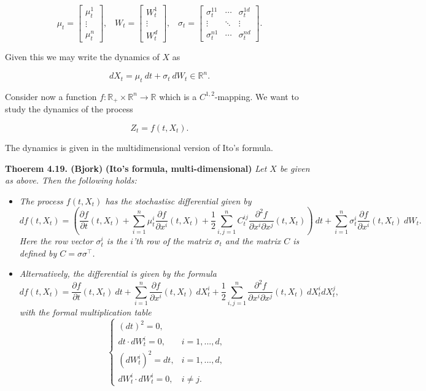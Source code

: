 \documentclass[a4paper,12pt,openany]{book}
\providecommand{\tightlist}{%
 \setlength{\itemsep}{0pt}\setlength{\parskip}{0pt}}
\begin{document}
\[
\mu_t=\begin{bmatrix}\mu^1_t\\ \vdots\\ \mu^n_t\end{bmatrix},\hspace{10pt}W_t=\begin{bmatrix}W^1_t\\ \vdots\\ W^d_t\end{bmatrix},\hspace{10pt}\sigma_t=\begin{bmatrix}\sigma^{11}_t & \cdots & \sigma^{1d}_t \\ \vdots & \ddots & \vdots\\ \sigma^{n1}_t &\cdots& \sigma^{nd}_t\end{bmatrix}.
\]

Given this we may write the dynamics of \(X\) as

\[
d X_t=\mu_t\ dt+\sigma_t\ dW_t\in\mathbb{R}^n.
\]

Consider now a function \(f:\mathbb{R}_+\times \mathbb{R}^n\to\mathbb{R}\) which is a \(C^{1,2}\)-mapping. We want to study the dynamics of the process

\[
Z_t=f(t,X_t).
\]

The dynamics is given in the multidimensional version of Ito's formula.

\textbf{Thoerem 4.19. (Bjork)} \textbf{(Ito's formula, multi-dimensional)} \emph{Let \(X\) be given as above. Then the following holds:}

\begin{itemize}
\tightlist
\item
  \emph{The process \(f(t,X_t)\) has the stochastisc differential given by}
  \[
    df(t,X_t)=\left(\frac{\partial f}{\partial t}(t,X_t) + \sum_{i=1}^n\mu^i_t\frac{\partial f}{\partial x^i}(t,X_t) + \frac{1}{2}\sum_{i,j=1}^nC_t^{ij}\frac{\partial^2 f}{\partial x^i\partial x^j}(t,X_t)\right)\ dt+\sum_{i=1}^n\sigma^i_t\frac{\partial f}{\partial x^i}(t,X_t)\ dW_t.
    \]
  \emph{Here the row vector \(\sigma^i_t\) is the \(i\)'th row of the matrix \(\sigma_t\) and the matrix \(C\) is defined by \(C=\sigma\sigma^\top\).}
\item
  \emph{Alternatively, the differential is given by the formula}
  \[
    df(t,X_t)=\frac{\partial f}{\partial t}(t,X_t)\ dt + \sum_{i=1}^n\frac{\partial f}{\partial x^i}(t,X_t)\ dX^i_t + \frac{1}{2}\sum_{i,j=1}^n\frac{\partial^2 f}{\partial x^i\partial x^j}(t,X_t)\ dX^i_tdX^j_t,
    \]
  \emph{with the formal multiplication table}
  \[
    \left\{\begin{matrix}(dt)^2=0,\\  dt\cdot dW_t^i=0, & i = 1,...,d,\\ (dW_t^i)^2=dt, & i=1,...,d, \\ dW_t^i\cdot dW_t^i =0, & i\ne j.\end{matrix}\right.
    \]
\end{itemize}
\end{document}

